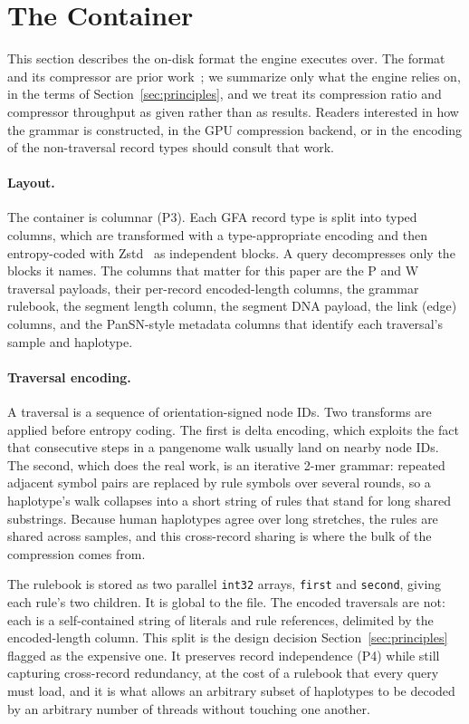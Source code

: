 \section{The Container}
\label{sec:container}

This section describes the on-disk format the engine executes over. The format
and its compressor are prior work~\cite{gfaz2026}; we summarize only what the
engine relies on, in the terms of Section~\ref{sec:principles}, and we treat its
compression ratio and compressor throughput as given rather than as results.
Readers interested in how the grammar is constructed, in the GPU compression
backend, or in the encoding of the non-traversal record types should consult that
work.

\paragraph{Layout.}
The container is columnar (P3). Each GFA record type is split into typed columns,
which are transformed with a type-appropriate encoding and then entropy-coded with
Zstd~\cite{collet2021rfc} as independent blocks. A query decompresses only the
blocks it names. The columns that matter for this paper are the P and W traversal
payloads, their per-record encoded-length columns, the grammar rulebook, the
segment length column, the segment DNA payload, the link (edge) columns, and the
PanSN-style metadata columns that identify each traversal's sample and haplotype.

\paragraph{Traversal encoding.}
A traversal is a sequence of orientation-signed node IDs. Two transforms are
applied before entropy coding. The first is delta encoding, which exploits the
fact that consecutive steps in a pangenome walk usually land on nearby node IDs.
The second, which does the real work, is an iterative 2-mer grammar: repeated
adjacent symbol pairs are replaced by rule symbols over several rounds, so a
haplotype's walk collapses into a short string of rules that stand for long
shared substrings. Because human haplotypes agree over long stretches, the rules
are shared across samples, and this cross-record sharing is where the bulk of the
compression comes from.

The rulebook is stored as two parallel \texttt{int32} arrays, \texttt{first} and
\texttt{second}, giving each rule's two children. It is global to the file. The
encoded traversals are not: each is a self-contained string of literals and rule
references, delimited by the encoded-length column. This split is the design
decision Section~\ref{sec:principles} flagged as the expensive one. It preserves
record independence (P4) while still capturing cross-record redundancy, at the
cost of a rulebook that every query must load, and it is what allows an arbitrary
subset of haplotypes to be decoded by an arbitrary number of threads without
touching one another.


